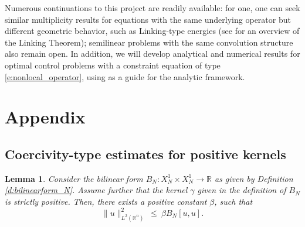 \documentclass[11pt]{amsart}   	%
\theoremstyle{plain}
\numberwithin{equation}{section}
\newtheorem{lemma}[thm]{Lemma}
\def\R{\mathbb{R}}
\newcommand{\GJ}[1]{{\color{red} {\bf Gabriela:} [#1] }}
\begin{document}


Numerous continuations to this project are readily available: for one, one can seek similar multiplicity results for equations with the same underlying operator but different geometric behavior, such as Linking-type energies (see \cite[Chapter 8]{struwe2000variational} for an overview of the Linking Theorem); semilinear problems with the same convolution structure also remain open. In addition, we will develop analytical and numerical results for optimal control problems with a constraint equation of type \eqref{e:nonlocal_operator}, using \cite{siktar2024superlinear} as a guide for the analytic framework. 




\appendix

\section{Appendix}\label{Sec: appendix}

\subsection{Coercivity-type estimates for positive kernels}\label{Subsec: posKer}

\begin{lemma}\label{Lem: AppendixPoincare}
Consider the bilinear form $B_N: X^1_N \times X^1_N \longrightarrow \R$ as given by Definition  \ref{d:bilinearform_N}. Assume further that the kernel $\gamma$ given in the definition of $B_N$ is strictly positive. Then, there exists a positive constant $\beta$, such that
\begin{equation}\label{e:poincare_2}
 \| u\|^2_{L^2(\R^n)} \ \leq \ \beta  B_N[u,u].
 \end{equation}
\end{lemma}
\end{document}
